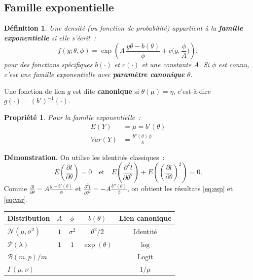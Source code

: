 \documentclass[11pt,letterpaper]{article}
\newtheorem{definition}{Définition}[section]
\newtheorem{propriete}{Propriété}[section]
\begin{document}
\subsection{Famille exponentielle}

\begin{definition}
Une densité (ou fonction de probabilité) appartient à la \textbf{famille exponentielle} si elle s'écrit~:
$$f(y;\theta,\phi) = \exp\left(A\,\frac{y\theta - b(\theta)}{\phi} + c\Big(y,\frac{\phi}{A}\Big)\right),$$
pour des fonctions spécifiques $b(\cdot)$ et $c(\cdot)$ et une constante $A$. Si $\phi$ est connu, c'est une famille exponentielle avec \textbf{paramètre canonique} $\theta$.
\end{definition}

Une fonction de lien $g$ est dite \textbf{canonique} si $\theta(\mu) = \eta$, c'est-à-dire $g(\cdot) = (b')^{-1}(\cdot)$.

\begin{propriete}
Pour la famille exponentielle~:
\begin{align}
E(Y) &= \mu = b'(\theta) \label{eq:esp}\\
Var(Y) &= \frac{b''(\theta)\,\phi}{A} \label{eq:var}
\end{align}
\end{propriete}

\textbf{Démonstration.} On utilise les identités classiques~:
$$E\left(\frac{\partial l}{\partial \theta}\right) = 0 \quad \text{et} \quad E\left(\frac{\partial^2 l}{\partial \theta^2}\right) + E\left(\left(\frac{\partial l}{\partial \theta}\right)^2\right) = 0.$$
Comme $\frac{\partial l}{\partial \theta} = A\frac{y - b'(\theta)}{\phi}$ et $\frac{\partial^2 l}{\partial \theta^2} = -A\frac{b''(\theta)}{\phi}$, on obtient les résultats \eqref{eq:esp} et \eqref{eq:var}.

\bigskip

\begin{center}
\begin{tabular}{|l|c|c|c|c|}
\hline
Distribution & $A$ & $\phi$ & $b(\theta)$ & Lien canonique \\
\hline
$\mathcal{N}(\mu,\sigma^2)$ & $1$ & $\sigma^2$ & $\theta^2/2$ & Identité \\
$\mathcal{P}(\lambda)$ & $1$ & $1$ & $\exp(\theta)$ & $\log$ \\
$\mathcal{B}(m,p)/m$ & & & & Logit \\
$\Gamma(\mu,\nu)$ & & & & $1/\mu$ \\
\hline
\end{tabular}
\end{center}
\end{document}
